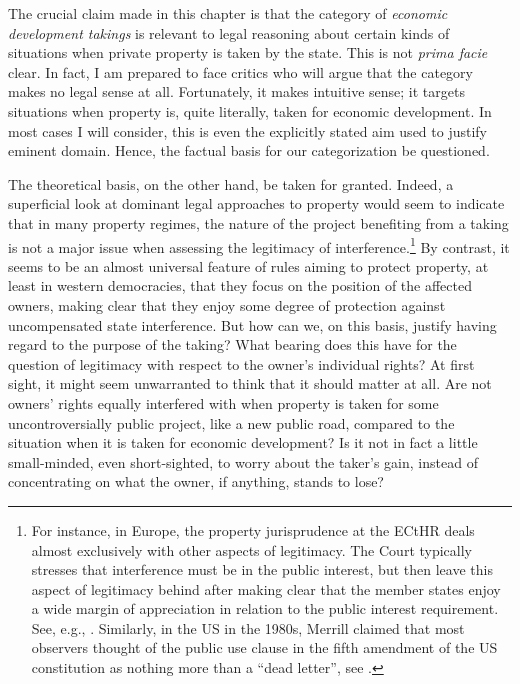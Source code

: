 The crucial claim made in this chapter is that the category of {\it economic development takings} is relevant to legal reasoning about certain kinds of situations when private property is taken by the state. This is not {\it prima facie} clear. In fact, I am prepared to face critics who will argue that the category makes no legal sense at all. Fortunately, it makes intuitive sense; it targets situations when property is, quite literally, taken for economic development. In most cases I will consider, this is even the explicitly stated aim used to justify eminent domain. Hence, the factual basis for our categorization  be questioned.

The theoretical basis, on the other hand,  be taken for granted. Indeed, a superficial look at dominant legal approaches to property would seem to indicate that in many property regimes, the nature of the project benefiting from a taking is not a major issue when assessing the legitimacy of interference.\footnote{For instance, in Europe, the property jurisprudence at the ECtHR deals almost exclusively with other aspects of legitimacy. The Court typically stresses that interference must be in the public interest, but then leave this aspect of legitimacy behind after making clear that the member states enjoy a wide margin of appreciation in relation to the public interest requirement. See, e.g., \cite{james86,lindheim12}. Similarly, in the US in the 1980s, Merrill claimed that most observers thought of the public use clause in the fifth amendment of the US constitution as nothing more than a ``dead letter'', see \cite[61]{merrill86}.} By contrast, it seems to be an almost universal feature of rules aiming to protect property, at least in western democracies, that they focus on the position of the affected owners, making clear that they enjoy some degree of protection against uncompensated state interference. But how can we, on this basis, justify having regard to the purpose of the taking? What bearing does this have for the question of legitimacy with respect to the owner's individual rights? At first sight, it might seem unwarranted to think that it should matter at all. Are not owners' rights equally interfered with when property is taken for some uncontroversially public project, like a new public road, compared to the situation when it is taken for economic development? Is it not in fact a little small-minded, even short-sighted, to worry about the taker's gain, instead of concentrating on what the owner, if anything, stands to lose?

